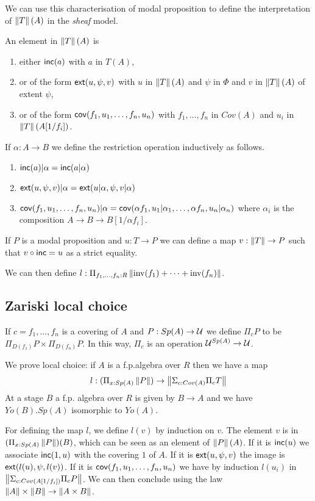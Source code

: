\medskip

We can use this characterisation of modal proposition to define the interpretation of
$\left\lVert T \right\rVert(A)$ in the {\em sheaf} model.

An element in $\left\lVert T \right\rVert(A)$ is
\begin{enumerate}
\item either $\mathsf{inc}(a)$ with $a$ in $T(A)$,
\item or of the form $\mathsf{ext}(u,\psi,v)$ with $u$ in $\left\lVert T \right\rVert(A)$ and $\psi$ in $\Phi$ and
  $v$ in $\left\lVert T \right\rVert(A)$ of extent $\psi$,
\item or of the form $\mathsf{cov}(f_1,u_1,\dots,f_n,u_n)$ with $f_1,\dots,f_n$ in $Cov(A)$ and $u_i$ in $\left\lVert T \right\rVert(A[1/f_i])$.
\end{enumerate}

If $\alpha:A\rightarrow B$ we define the restriction operation inductively as follows.
\begin{enumerate}
\item $\mathsf{inc}(a)|\alpha = \mathsf{inc}(a|\alpha)$
\item $\mathsf{ext}(u,\psi,v)|\alpha = \mathsf{ext}(u|\alpha,\psi,v|\alpha)$
\item $\mathsf{cov}(f_1,u_1,\dots,f_n,u_n)|\alpha = \mathsf{cov}(\alpha f_1,u_1|\alpha_1,\dots,\alpha f_n,u_n|\alpha_n)$ where
  $\alpha_i$ is the composition $A\rightarrow B\rightarrow B[1/\alpha f_i]$.
\end{enumerate}

If $P$ is a modal proposition and $u:T\rightarrow P$ we can define a map $v:\left\lVert T \right\rVert\rightarrow P$
such that $v\circ\mathsf{inc} = u$ as a strict equality.

We can then define $l:\Pi_{f_1,\dots,f_n:R}\left\lVert \mathrm{inv}(f_1)+\dots+\mathrm{inv}(f_n) \right\rVert$.

\subsection{Zariski local choice}

If $c = f_1,\dots,f_n$ is a covering of $A$ and $P:Sp(A)\rightarrow \mathcal{U}$ we define
$\Pi_c P$ to be $\Pi_{D(f_1)}P\times\Pi_{D(f_n)}P$. In this way, $\Pi_c$ is an operation
$\mathcal{U}^{Sp(A)}\rightarrow\mathcal{U}$.

We prove local choice: if $A$ is a f.p.\@ algebra over $R$ then we have a map
$$
l:(\Pi_{x:Sp(A)}\left\lVert P \right\rVert)\rightarrow \left\lVert \Sigma_{c:Cov(A)}\Pi_cT \right\rVert
$$
At a stage $B$ a f.p. algebra over $R$ is given by $B\rightarrow A$ and we have $Yo(B).Sp(A)$ isomorphic
to $Yo(A)$.

For defining the map $l$, we define $l(v)$ by induction on $v$.
The element $v$ is in $(\Pi_{x:Sp(A)}\left\lVert P \right\rVert)(B)$, which can be seen as
an element of $\left\lVert P \right\rVert(A)$. If it is $\mathsf{inc}(u)$ we associate $\mathsf{inc}(1,u)$ with the covering $1$ of $A$.
If it is $\mathsf{ext}(u,\psi,v)$ the image is $\mathsf{ext}(l(u),\psi,l(v))$.
If it is $\mathsf{cov}(f_1,u_1,\dots,f_n,u_n)$ we have by induction $l(u_i)$ in $\left\lVert \Sigma_{c:Cov(A[1/f_i])}\Pi_c P \right\rVert$.
We can then conclude using the law $\left\lVert A \right\rVert\times \left\lVert B \right\rVert\rightarrow\left\lVert A\times B \right\rVert$.

